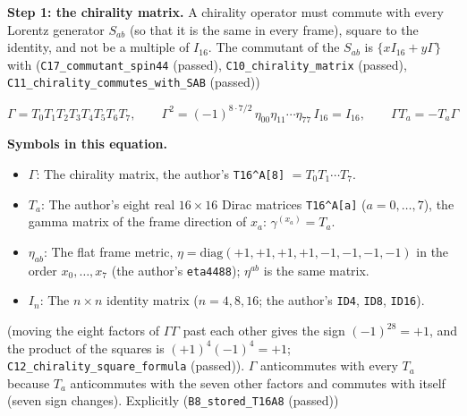 \documentclass[
  10pt,
]{article}
\providecommand{\tightlist}{%
  \setlength{\itemsep}{0pt}\setlength{\parskip}{0pt}}
\begin{document}
\textbf{Step 1: the chirality matrix.} A chirality operator must commute
with every Lorentz generator \(S_{ab}\) (so that it is the same in every
frame), square to the identity, and not be a multiple of \(I_{16}\). The
commutant of the \(S_{ab}\) is \(\{xI_{16} + y\Gamma\}\) with
(\texttt{C17\_commutant\_spin44} (passed),
\texttt{C10\_chirality\_matrix} (passed),
\texttt{C11\_chirality\_commutes\_with\_SAB} (passed))

\[
\Gamma = T_0T_1T_2T_3T_4T_5T_6T_7,\qquad \Gamma^2 = (-1)^{8\cdot7/2}\,\eta_{00}\eta_{11}\cdots\eta_{77}\,I_{16} = I_{16},\qquad \Gamma T_a = -T_a\Gamma
\]

\textbf{Symbols in this equation.}

\begin{itemize}
\tightlist
\item
  \(\Gamma\): The chirality matrix, the author's
  \texttt{T16\^{}A{[}8{]}} \(= T_0 T_1 \cdots T_7\).
\item
  \(T_a\): The author's eight real \(16 \times 16\) Dirac matrices
  \texttt{T16\^{}A{[}a{]}} (\(a = 0, \dots, 7\)), the gamma matrix of
  the frame direction of \(x_a\): \(\gamma^{(x_a)} = T_a\).
\item
  \(\eta_{ab}\): The flat frame metric,
  \(\eta = \mathrm{diag}(+1, +1, +1, +1, -1, -1, -1, -1)\) in the order
  \(x_0, \dots, x_7\) (the author's \texttt{eta4488}); \(\eta^{ab}\) is
  the same matrix.
\item
  \(I_n\): The \(n \times n\) identity matrix (\(n = 4, 8, 16\); the
  author's \texttt{ID4}, \texttt{ID8}, \texttt{ID16}).
\end{itemize}

(moving the eight factors of \(\Gamma\Gamma\) past each other gives the
sign \((-1)^{28} = +1\), and the product of the squares is
\((+1)^4(-1)^4 = +1\); \texttt{C12\_chirality\_square\_formula}
(passed)). \(\Gamma\) anticommutes with every \(T_a\) because \(T_a\)
anticommutes with the seven other factors and commutes with itself
(seven sign changes). Explicitly (\texttt{B8\_stored\_T16A8} (passed))
\end{document}
